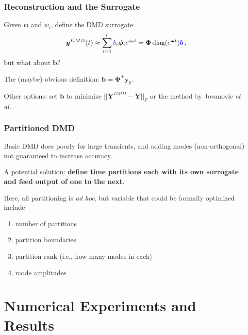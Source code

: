 \documentclass[fleqn]{beamer}
\renewcommand{\vec}[1]{\bm{#1}} %
\begin{document}
\begin{frame}
\frametitle{Reconstruction and the Surrogate}

Given $\mathbf{\phi}$ and $w_i$, define the DMD surrogate
\begin{equation*}
 \vec{y}^{DMD}(t)\approx \sum_{i=1}^{r} \textcolor{blue}{b}_i \boldsymbol{\phi}_i e^{\omega_it}={{\boldsymbol{\Phi}}} \, {\textrm{diag}}(e^{\vec{\omega}t})\vec{\textcolor{blue}{b}} \, ,
\end{equation*}
but what about $\mathbf{b}$?


\vfill 
\pause

The (maybe) obvious definition: $\mathbf{b} = \boldsymbol{\Phi}^+ \mathbf{y}_0$.

\vfill 
\pause 

Other options: set $\mathbf{b}$ to minimize $||\mathbf{Y}^{DMD} - \mathbf{Y}||_F$ or the method by Jovanovic {\it et al}.


\vfill

\end{frame}

\begin{frame}
\frametitle{Partitioned DMD}


Basic DMD does poorly for large transients, and adding modes (non-orthogonal) not guaranteed to increase accuracy.

\vfill 
\pause

A potential solution: {\bf define time partitions each with its own surrogate and feed output of one to the next}.

\vfill 
\pause

Here, all partitioning is {\it ad hoc}, but variable that could be formally optimized include
\begin{enumerate}
 \item number of partitions
 \item partition boundaries
 \item partition rank (i.e., how many modes in each)
 \item mode amplitudes
\end{enumerate}

\end{frame}



\section{Numerical Experiments and Results}
\end{document}
